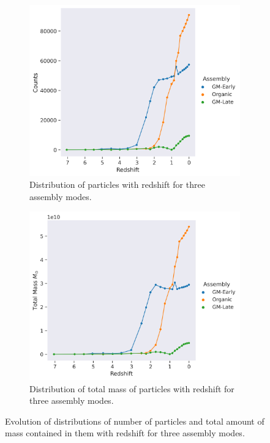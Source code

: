 \documentclass{article}
\begin{document}
	
	\begin{figure}
		\centering
		\begin{subfigure} {.5\columnwidth}
				\centering 
				\includegraphics[width=\columnwidth]{../../plots/mass_plotter/particle_distribution_wrt_redshift.png}
				\caption{Distribution of particles with redshift for three assembly modes.}
		\end{subfigure}
			\hfill
		\begin{subfigure} {.45\columnwidth}
				\centering 
				\includegraphics[width=\columnwidth]{../../plots/mass_plotter/total_mass_wrt_redshift.png}
				\caption{Distribution of total mass of particles with redshift for three assembly modes.}
		\end{subfigure}
		\caption{Evolution of distributions of number of particles and total amount of mass contained in them with redshift for three assembly modes.}
	\end{figure}
\end{document}
